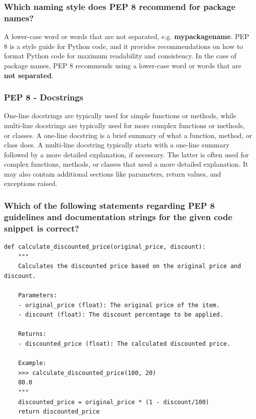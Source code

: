 \subsubsection{Which naming style does PEP 8 recommend for package names?}
A lower-case word or words that are not separated, e.g. \textbf{mypackagename}. PEP 8 is a style guide for Python code, and it provides recommendations on how to format Python code for maximum readability and consistency. In the case of package names, PEP 8 recommends using a lower-case word or words that are \textbf{not separated}.

\subsubsection{PEP 8 - Docstrings}
One-line docstrings are typically used for simple functions or methods, while multi-line docstrings are typically used for more complex functions or methods, or classes. A one-line docstring is a brief summary of what a function, method, or class does. A multi-line docstring typically starts with a one-line summary followed by a more detailed explanation, if necessary. The latter is often used for complex functions, methods, or classes that need a more detailed explanation. It may also contain additional sections like parameters, return values, and exceptions raised.

\newpage
\subsubsection{Which of the following statements regarding PEP 8 guidelines and documentation strings for the given code snippet is correct?}
\begin{codebox}
\begin{verbatim}
def calculate_discounted_price(original_price, discount):
    """
    Calculates the discounted price based on the original price and discount.
 
    Parameters:
    - original_price (float): The original price of the item.
    - discount (float): The discount percentage to be applied.
 
    Returns:
    - discounted_price (float): The calculated discounted price.
 
    Example:
    >>> calculate_discounted_price(100, 20)
    80.0
    """
    discounted_price = original_price * (1 - discount/100)
    return discounted_price
\end{verbatim}
\end{codebox}

